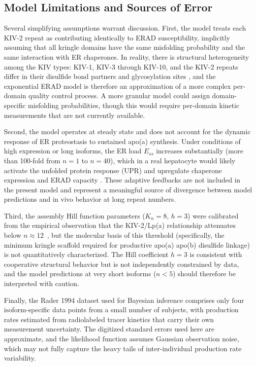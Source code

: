\documentclass[12pt,letterpaper]{article}
\begin{document}
\subsection{Model Limitations and Sources of Error}

Several simplifying assumptions warrant discussion. First, the model treats each KIV-2 repeat as contributing identically to ERAD susceptibility, implicitly assuming that all kringle domains have the same misfolding probability and the same interaction with ER chaperones. In reality, there is structural heterogeneity among the KIV types: KIV-1, KIV-3 through KIV-10, and the KIV-2 repeats differ in their disulfide bond partners and glycosylation sites \citep{schmidt2016structure}, and the exponential ERAD model is therefore an approximation of a more complex per-domain quality control process. A more granular model could assign domain-specific misfolding probabilities, though this would require per-domain kinetic measurements that are not currently available.

Second, the model operates at steady state and does not account for the dynamic response of ER proteostasis to sustained apo(a) synthesis. Under conditions of high expression or long isoforms, the ER load $E_{ss}$ increases substantially (more than 100-fold from $n = 1$ to $n = 40$), which in a real hepatocyte would likely activate the unfolded protein response (UPR) and upregulate chaperone expression and ERAD capacity \citep{walter2011unfolded}. These adaptive feedbacks are not included in the present model and represent a meaningful source of divergence between model predictions and in vivo behavior at long repeat numbers.

Third, the assembly Hill function parameters ($K_n = 8$, $h = 3$) were calibrated from the empirical observation that the KIV-2/Lp(a) relationship attenuates below $n \approx 12$\ \quad \citep{mukamel2021protein}, but the molecular basis of this threshold (specifically, the minimum kringle scaffold required for productive apo(a) apo(b) disulfide linkage) is not quantitatively characterized. The Hill coefficient $h = 3$ is consistent with cooperative structural behavior but is not independently constrained by data, and the model predictions at very short isoforms ($n < 5$) should therefore be interpreted with caution.

Finally, the Rader 1994 dataset used for Bayesian inference comprises only four isoform-specific data points from a small number of subjects, with production rates estimated from radiolabeled tracer kinetics that carry their own measurement uncertainty. The digitized standard errors used here are approximate, and the likelihood function assumes Gaussian observation noise, which may not fully capture the heavy tails of inter-individual production rate variability.
\end{document}
